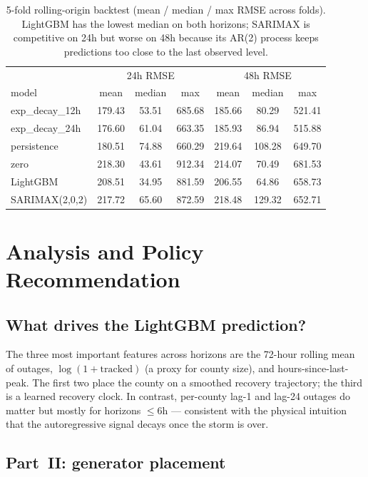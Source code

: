 \documentclass[11pt]{article}
\begin{document}
\begin{table}[h]
\centering
\begin{tabular}{lcccccc}
\toprule
 & \multicolumn{3}{c}{24h RMSE} & \multicolumn{3}{c}{48h RMSE} \\
model & mean & median & max & mean & median & max \\
\midrule
exp\_decay\_12h  & 179.43 & 53.51  & 685.68 & 185.66 & 80.29  & 521.41 \\
exp\_decay\_24h  & 176.60 & 61.04  & 663.35 & 185.93 & 86.94  & 515.88 \\
persistence       & 180.51 & 74.88  & 660.29 & 219.64 & 108.28 & 649.70 \\
zero              & 218.30 & 43.61  & 912.34 & 214.07 & 70.49  & 681.53 \\
LightGBM          & 208.51 & 34.95  & 881.59 & 206.55 & 64.86  & 658.73 \\
SARIMAX(2,0,2)    & 217.72 & 65.60  & 872.59 & 218.48 & 129.32 & 652.71 \\
\bottomrule
\end{tabular}
\caption{5-fold rolling-origin backtest (mean / median / max RMSE across
folds). LightGBM has the lowest median on both horizons; SARIMAX is
competitive on 24h but worse on 48h because its AR(2) process keeps
predictions too close to the last observed level.\label{tab:backtest}}
\end{table}

\section{Analysis and Policy Recommendation}

\subsection{What drives the LightGBM prediction?}

The three most important features across horizons are the 72-hour rolling
mean of outages, $\log(1+\text{tracked})$ (a proxy for county size), and
hours-since-last-peak. The first two place the county on a smoothed
recovery trajectory; the third is a learned recovery clock. In contrast,
per-county lag-1 and lag-24 outages do matter but mostly for horizons
$\le 6$h --- consistent with the physical intuition that the autoregressive
signal decays once the storm is over.

\subsection{Part~II: generator placement}
\end{document}
